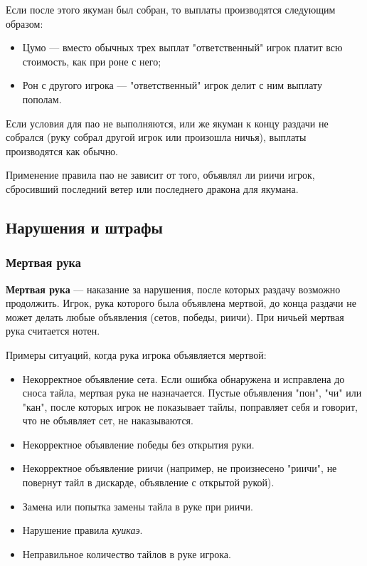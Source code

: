 Если после этого якуман был собран, то выплаты производятся следующим образом:
\begin{itemize}
	\item Цумо --- вместо обычных трех выплат "ответственный" игрок платит всю стоимость, как при роне с него;
	\item Рон с другого игрока --- "ответственный" игрок делит с ним выплату пополам.
\end{itemize}

Если условия для пао не выполняются, или же якуман к концу раздачи не собрался (руку собрал другой игрок или произошла ничья), выплаты производятся как обычно.

Применение правила пао не зависит от того, объявлял ли риичи игрок, сбросивший последний ветер или последнего дракона для якумана. 

\subsection{Нарушения и штрафы}
\subsubsection{Мертвая рука}
\textbf{Мертвая рука} --- наказание за нарушения, после которых раздачу возможно продолжить. Игрок, рука которого была объявлена мертвой, до конца раздачи не может делать любые объявления (сетов, победы, риичи). При ничьей мертвая рука считается нотен. 

Примеры ситуаций, когда рука игрока объявляется мертвой:
\begin{itemize}
	\item Некорректное объявление сета. Если ошибка обнаружена и исправлена до сноса тайла, мертвая рука не назначается. Пустые объявления "пон", "чи" или "кан", после которых игрок не показывает тайлы, поправляет себя и говорит, что не объявляет сет, не наказываются.
	\item Некорректное объявление победы без открытия руки.
	\item Некорректное объявление риичи (например, не произнесено "риичи", не повернут тайл в дискарде, объявление с открытой рукой).
	\item Замена или попытка замены тайла в руке при риичи.
	\item Нарушение правила \textit{куикаэ}.
	\item Неправильное количество тайлов в руке игрока.
\end{itemize}

